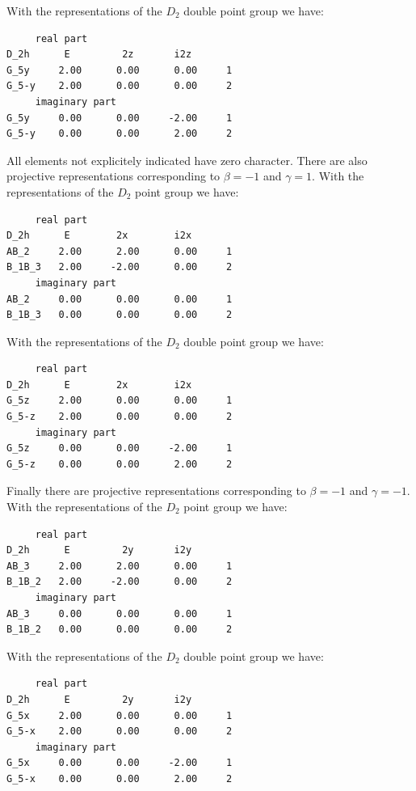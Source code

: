 \documentclass[12pt,a4paper]{article}
\begin{document}
With the representations of the $D_2$ double point group we have:
\begin{verbatim}
     real part
D_2h      E         2z       i2z
G_5y     2.00      0.00      0.00     1
G_5-y    2.00      0.00      0.00     2
     imaginary part
G_5y     0.00      0.00     -2.00     1
G_5-y    0.00      0.00      2.00     2
\end{verbatim}
All elements not explicitely indicated have zero character.
There are also projective representations corresponding to $\beta=-1$ 
and $\gamma=1$. With the representations of the $D_2$ point group we have:
\begin{verbatim}
     real part
D_2h      E        2x        i2x
AB_2     2.00      2.00      0.00     1
B_1B_3   2.00     -2.00      0.00     2
     imaginary part
AB_2     0.00      0.00      0.00     1
B_1B_3   0.00      0.00      0.00     2
\end{verbatim}
With the representations of the $D_2$ double point group we have:
\begin{verbatim}
     real part
D_2h      E        2x        i2x
G_5z     2.00      0.00      0.00     1
G_5-z    2.00      0.00      0.00     2
     imaginary part
G_5z     0.00      0.00     -2.00     1
G_5-z    0.00      0.00      2.00     2
\end{verbatim}
Finally there are projective representations corresponding to
$\beta=-1$ and $\gamma=-1$. With the representations of the $D_2$ point
group we have: 
\begin{verbatim}
     real part
D_2h      E         2y       i2y
AB_3     2.00      2.00      0.00     1
B_1B_2   2.00     -2.00      0.00     2
     imaginary part
AB_3     0.00      0.00      0.00     1
B_1B_2   0.00      0.00      0.00     2
\end{verbatim}
With the representations of the $D_2$ double point group we have:
\begin{verbatim}
     real part
D_2h      E         2y       i2y
G_5x     2.00      0.00      0.00     1
G_5-x    2.00      0.00      0.00     2
     imaginary part
G_5x     0.00      0.00     -2.00     1
G_5-x    0.00      0.00      2.00     2
\end{verbatim}

\newpage
\end{document}
